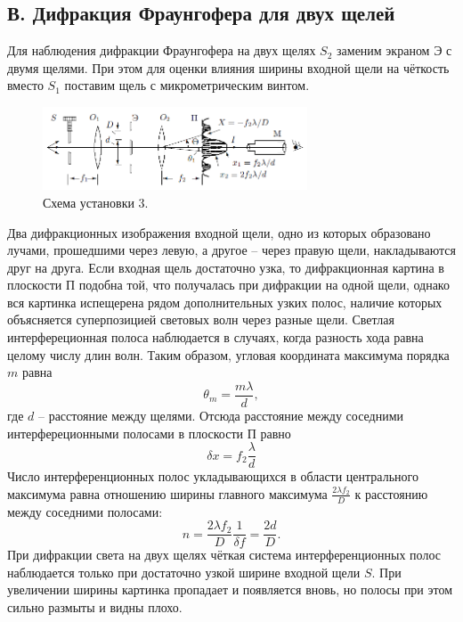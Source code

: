 \documentclass[a4paper,12pt]{report}
\begin{document}
\subsection*{В. Дифракция Фраунгофера для двух щелей}
Для наблюдения дифракции Фраунгофера на двух щелях $S_2$ заменим экраном Э с двумя щелями. При этом для оценки влияния ширины входной щели на чёткость вместо $S_1$ поставим щель с микрометрическим винтом.
\begin{figure}[H]
\includegraphics[width = 0.7\textwidth]{4.png}
\centering
\caption{Схема установки 3.}
\end{figure}
Два дифракционных изображения входной щели, одно из которых образовано лучами, прошедшими через левую, а другое -- через правую щели, накладываются друг на друга.
Если входная щель достаточно узка, то дифракционная картина в плоскости П подобна той, что получалась при дифракции на одной щели, однако вся картинка испещерена рядом дополнительных узких полос, наличие которых объясняется суперпозицией световых волн через разные щели. Светлая интерфереционная полоса наблюдается в случаях, когда разность хода равна целому числу длин волн. Таким образом, угловая координата максимума порядка $m$ равна
\begin{equation}
\theta_m = \dfrac{m \lambda}{d},
\end{equation}
где $d$ -- расстояние между щелями. Отсюда расстояние между соседними интерфереционными полосами в плоскости П равно
\begin{equation}
\delta x = f_2 \dfrac{\lambda}{d}
\end{equation}
Число интерференционных полос укладывающихся в области центрального максимума равна отношению ширины главного максимума $\frac{2\lambda f_2}{D}$ к расстоянию между соседними полосами:
\begin{equation}
n = \dfrac{2\lambda f_2}{D} \dfrac{1}{\delta f}= \dfrac{2d}{D}.
\end{equation}
При дифракции света на двух щелях чёткая система интерференционных полос наблюдается только при достаточно узкой ширине входной щели $S$. При увеличении ширины картинка пропадает и появляется вновь, но полосы при этом сильно размыты и видны плохо.
\end{document}
